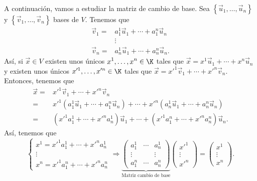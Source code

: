  A continuación, vamos a estudiar la matriz de cambio de base. Sea $\displaystyle \left\{ \vec{u}_{1}, \ldots, \vec{u}_{n}\right\}  $ y $\displaystyle \left\{ \vec{v}_{1}, \ldots, \vec{v}_{n}\right\}  $ bases de $\displaystyle V $. Tenemos que 
 \[
 \begin{split}
	 \vec{v}_{1} = & a^{1}_{1}\vec{u}_{1} + \cdots + a^{n}_{1}\vec{u}_{n} \\
		       & \vdots \\
	 \vec{v}_{n} = & a^{1}_{n} \vec{u}_{1} + \cdots + a^{n}_{n}\vec{u}_{n}.
 \end{split}
 \]
Así, si $\displaystyle \vec{x} \in V $ existen unos únicos $\displaystyle x^{1}, \ldots, x^{n} \in \K $ tales que $\displaystyle \vec{x} = x^{1}\vec{u}_{1} + \cdots + x^{n}\vec{u}_{n} $ y existen unos únicos $\displaystyle x'^{1}, \ldots, x'^{n} \in \K $ tales que $\displaystyle \vec{x} = x'^{1}\vec{v}_{1} + \cdots + x'^{n}\vec{v}_{n} $. Entonces, tenemos que
\[
\begin{split}
	\vec{x} = & x'^{1}\vec{v}_{1} + \cdots + x'^{n}\vec{v}_{n} \\
	= & x'^{1}\left(a^{1}_{1}\vec{u}_{1} + \cdots + a^{n}_{1}\vec{u}_{n}\right) + \cdots + x'^{n}\left(a^{1}_{n}\vec{u}_{1} + \cdots + a^{n}_{n}\vec{u}_{n}\right) \\
	= & \left(x'^{1}a^{1}_{1} + \cdots + x'^{n}a^{1}_{n}\right)\vec{u}_{1} + \cdots + \left(x'^{1}a^{n}_{1} + \cdots + x'^{n}a^{n}_{n}\right)\vec{u}_{n} .
\end{split}
\]
Así, tenemos que 
\[
\begin{cases}
x^{1} = x'^{1}a^{1}_{1} + \cdots + x'^{n}a^{1}_{n} \\
\vdots \\
x^{n} = x'^{1}a^{n}_{1} + \cdots + x'^{n}a^{n}_{n}
\end{cases}
\Rightarrow \underbrace{\begin{pmatrix} a^{1}_{1} & \cdots & a^{1}_{n} \\
\vdots & & \vdots \\
a^{n}_{1} & \cdots & a^{n}_{n}\end{pmatrix}}_{\text{Matriz cambio de base}} \begin{pmatrix} x'^{1} \\ \vdots \\ x'^{n} \end{pmatrix} = \begin{pmatrix} x^{1} \\ \vdots \\ x^{n} \end{pmatrix}
.\]

